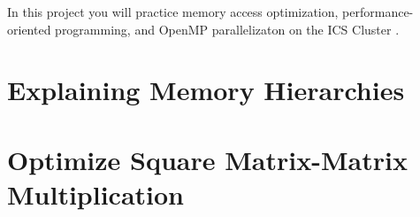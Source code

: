 \documentclass[unicode,11pt,a4paper,oneside,numbers=endperiod,openany]{scrartcl}
\begin{document}
\setassignment
{}

\newline

\assignmentpolicy
In this project you will practice memory access optimization, performance-oriented programming, and OpenMP parallelizaton 
on the ICS Cluster .  

\section{Explaining Memory Hierarchies }


\section{Optimize Square Matrix-Matrix Multiplication  }
\end{document}
